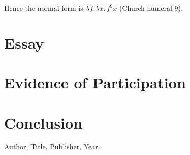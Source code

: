 \documentclass{article}
\theoremstyle{theorem}
\theoremstyle{definition}
\theoremstyle{remark}
\begin{document}
Hence the normal form is $\lambda f.\lambda x.\,f^{9}x$ (Church numeral $9$).

\section{Essay}

\section{Evidence of Participation}

\section{Conclusion}\label{conclusion}

\begin{thebibliography}{99}
 Author, \href{https://en.wikipedia.org/wiki/LaTeX}{Title}, Publisher, Year.
\end{thebibliography}
\end{document}

